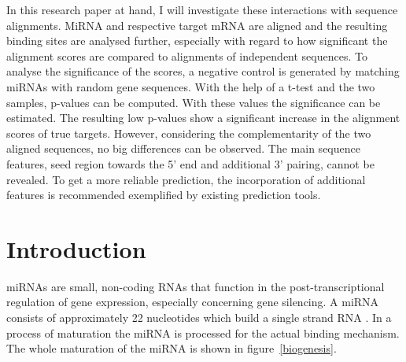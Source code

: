 \documentclass[11pt, a4paper, oneside]{book}
\begin{document}
In this research paper at hand, I will investigate these interactions with sequence alignments. MiRNA and respective target mRNA are aligned and the resulting binding sites are analysed further, especially with regard to how significant the alignment scores are compared to alignments of independent sequences. To analyse the significance of the scores, a negative control is generated by matching miRNAs with random gene sequences. With the help of a t-test and the two samples, p-values can be computed. With these values the significance can be estimated. The resulting low p-values show a significant increase in the alignment scores of true targets. However, considering the complementarity of the two aligned sequences, no big differences can be observed. The main sequence features, seed region towards the 5' end and additional 3' pairing, cannot be revealed. To get a more reliable prediction, the incorporation of additional features is recommended exemplified by existing prediction tools.
 
\newpage

\tableofcontents


\pagestyle{plain}






\chapter{Introduction}
\label{chapter:introduction}

miRNAs are small, non-coding RNAs that function in the post-transcriptional regulation of gene expression, especially concerning gene silencing. A miRNA consists of approximately 22 nucleotides which build a single strand RNA \cite{Bartel}. In a process of maturation the miRNA is processed for the actual binding mechanism. The whole maturation of the miRNA is shown in figure~\ref{biogenesis}.\\
\end{document}
